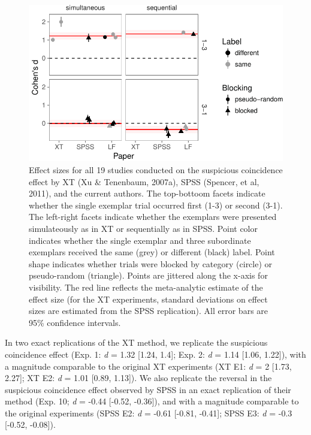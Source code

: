 \documentclass[english,floatsintext,man]{apa6}
\newcounter{author}
\theoremstyle{definition}
\theoremstyle{definition}
\theoremstyle{remark}
\begin{document}
\begin{figure}
\centering
\includegraphics{xtmem_files/figure-latex/unnamed-chunk-4-1.pdf}
\caption{\label{fig:unnamed-chunk-4}Effect sizes for all 19 studies
conducted on the suspicious coincidence effect by XT (Xu \& Tenenbaum,
2007a), SPSS (Spencer, et al, 2011), and the current authors. The
top-bottoom facets indicate whether the single exemplar trial occurred
first (1-3) or second (3-1). The left-right facets indicate whether the
exemplars were presented simulateously as in XT or sequentially as in
SPSS. Point color indicates whether the single exemplar and three
subordinate exemplars received the same (grey) or different (black)
label. Point shape indicates whether trials were blocked by category
(circle) or pseudo-random (triangle). Points are jittered along the
x-axis for visibility. The red line reflects the meta-analytic estimate
of the effect size (for the XT experiments, standard deviations on
effect sizes are estimated from the SPSS replication). All error bars
are 95\% confidence intervals.}
\end{figure}

In two exact replications of the XT method, we replicate the suspicious
coincidence effect (Exp. 1: \emph{d} = 1.32 {[}1.24, 1.4{]}; Exp. 2:
\emph{d} = 1.14 {[}1.06, 1.22{]}), with a magnitude comparable to the
original XT experiments (XT E1: \emph{d} = 2 {[}1.73, 2.27{]}; XT E2:
\emph{d} = 1.01 {[}0.89, 1.13{]}). We also replicate the reversal in the
suspicious coincidence effect observed by SPSS in an exact replication
of their method (Exp. 10; \emph{d} = -0.44 {[}-0.52, -0.36{]}), and with
a magnitude comparable to the original experiments (SPSS E2: \emph{d} =
-0.61 {[}-0.81, -0.41{]}; SPSS E3: \emph{d} = -0.3 {[}-0.52, -0.08{]}).
\end{document}
